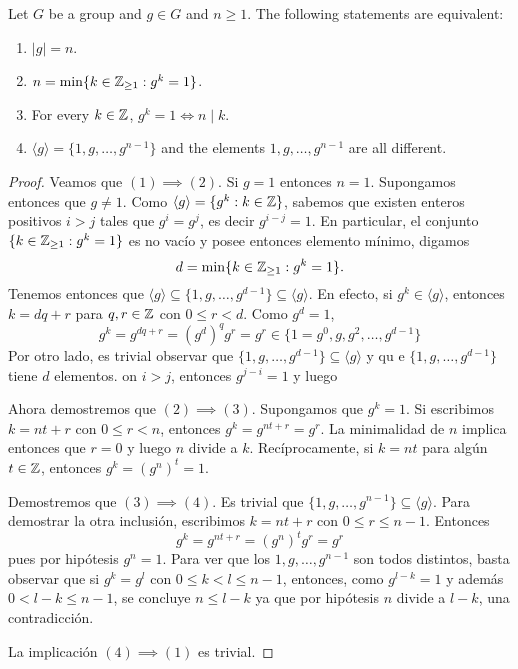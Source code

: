 \begin{theorem}
        Let $G$ be a group and $g\in G$ and $n\geq1$. 
        The following statements are equivalent:
        \begin{enumerate}
                \item $|g|=n$.
                \item $n=\min\{k\in\mathbb{Z}_{\geq1}:g^k=1\}$.
                \item For every $k\in\mathbb{Z}$, $g^k=1\Longleftrightarrow n\mid k$.
                \item $\langle g\rangle=\{1,g,\dots,g^{n-1}\}$ and 
                the elements $1,g,\dots,g^{n-1}$ are all different.
        \end{enumerate}
\end{theorem}


\begin{proof}
        Veamos que $(1)\implies(2)$.
        Si $g=1$ entonces $n=1$. Supongamos entonces que $g\ne1$. Como $\langle g\rangle=\{g^k:k\in\mathbb{Z}\}$,
        sabemos que existen enteros positivos $i>j$ tales que $g^i=g^j$, es decir $g^{i-j}=1$. En particular,
        el conjunto $\{k\in\mathbb{Z}_{\geq1}:g^k=1\}$ es no vacío y posee entonces elemento mínimo, digamos
        \[
        d=\min\{k\in\mathbb{Z}_{\geq1}:g^k=1\}.
        \]
        Tenemos entonces que $\langle g\rangle\subseteq\{1,g,\dots,g^{d-1}\}\subseteq\langle g\rangle$. En efecto, si $g^k\in\langle g\rangle$, entonces $k=dq+r$ para $q,r\in\mathbb{Z}$ con $0\leq r<d$. Como $g^d=1$,
        \[
        g^k=g^{dq+r}=(g^d)^qg^r=g^r\in\{1=g^0,g,g^2,\dots,g^{d-1}\}
        \]
        Por otro lado, es trivial observar que $\{1,g,\dots,g^{d-1}\}\subseteq \langle g\rangle$ y qu
e
        $\{1,g,\dots,g^{d-1}\}$ tiene $d$ elementos.
on $i>j$, entonces $g^{j-i}=1$ y luego

        Ahora demostremos que $(2)\implies(3)$. Supongamos que $g^k=1$. Si
        escribimos $k=nt+r$ con $0\leq r<n$, entonces $g^k=g^{nt+r}=g^r$. La
        minimalidad de $n$ implica entonces que $r=0$ y luego $n$ divide a $k$.
        Recíprocamente, si $k=nt$ para algún $t\in\mathbb{Z}$, entonces $g^k=(g^n)^t=1$.

        Demostremos que $(3)\implies(4)$. Es trivial que
        $\{1,g,\dots,g^{n-1}\}\subseteq\langle g\rangle$. Para demostrar la otra
        inclusión, escribimos $k=nt+r$ con $0\leq r\leq n-1$. Entonces
        \[
                g^k=g^{nt+r}=(g^n)^tg^r=g^r
        \]
        pues por hipótesis $g^n=1$. Para ver que los
        $1,g,\dots,g^{n-1}$ son todos distintos, basta observar que si $g^k=g^l$ con $0\leq
        k<l\leq n-1$, entonces, como $g^{l-k}=1$ y además $0<l-k\leq n-1$, se concluye $n\leq l-k$ ya
 que
        por hipótesis $n$ divide a $l-k$, una contradicción.

        La implicación $(4)\implies(1)$ es trivial.
\end{proof}

